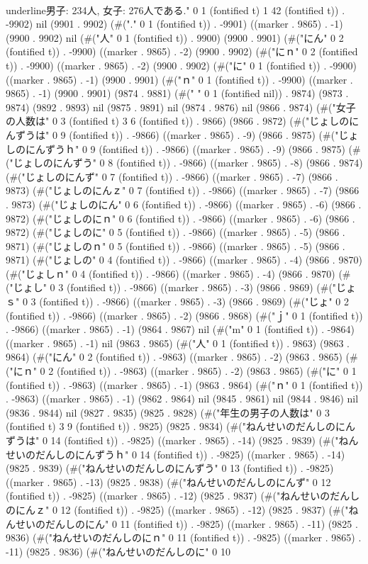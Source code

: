	      \\underline{男子: 234人, 女子: 276人}である." 0 1 (fontified t) 1 42 (fontified t)) . -9902) nil (9901 . 9902) (#("." 0 1 (fontified t)) . -9901) ((marker . 9865) . -1) (9900 . 9902) nil (#("人" 0 1 (fontified t)) . 9900) (9900 . 9901) (#("にん" 0 2 (fontified t)) . -9900) ((marker . 9865) . -2) (9900 . 9902) (#("にｎ" 0 2 (fontified t)) . -9900) ((marker . 9865) . -2) (9900 . 9902) (#("に" 0 1 (fontified t)) . -9900) ((marker . 9865) . -1) (9900 . 9901) (#("ｎ" 0 1 (fontified t)) . -9900) ((marker . 9865) . -1) (9900 . 9901) (9874 . 9881) (#(" " 0 1 (fontified nil)) . 9874) (9873 . 9874) (9892 . 9893) nil (9875 . 9891) nil (9874 . 9876) nil (9866 . 9874) (#("女子の人数は" 0 3 (fontified t) 3 6 (fontified t)) . 9866) (9866 . 9872) (#("じょしのにんずうは" 0 9 (fontified t)) . -9866) ((marker . 9865) . -9) (9866 . 9875) (#("じょしのにんずうｈ" 0 9 (fontified t)) . -9866) ((marker . 9865) . -9) (9866 . 9875) (#("じょしのにんずう" 0 8 (fontified t)) . -9866) ((marker . 9865) . -8) (9866 . 9874) (#("じょしのにんず" 0 7 (fontified t)) . -9866) ((marker . 9865) . -7) (9866 . 9873) (#("じょしのにんｚ" 0 7 (fontified t)) . -9866) ((marker . 9865) . -7) (9866 . 9873) (#("じょしのにん" 0 6 (fontified t)) . -9866) ((marker . 9865) . -6) (9866 . 9872) (#("じょしのにｎ" 0 6 (fontified t)) . -9866) ((marker . 9865) . -6) (9866 . 9872) (#("じょしのに" 0 5 (fontified t)) . -9866) ((marker . 9865) . -5) (9866 . 9871) (#("じょしのｎ" 0 5 (fontified t)) . -9866) ((marker . 9865) . -5) (9866 . 9871) (#("じょしの" 0 4 (fontified t)) . -9866) ((marker . 9865) . -4) (9866 . 9870) (#("じょしｎ" 0 4 (fontified t)) . -9866) ((marker . 9865) . -4) (9866 . 9870) (#("じょし" 0 3 (fontified t)) . -9866) ((marker . 9865) . -3) (9866 . 9869) (#("じょｓ" 0 3 (fontified t)) . -9866) ((marker . 9865) . -3) (9866 . 9869) (#("じょ" 0 2 (fontified t)) . -9866) ((marker . 9865) . -2) (9866 . 9868) (#("ｊ" 0 1 (fontified t)) . -9866) ((marker . 9865) . -1) (9864 . 9867) nil (#("m" 0 1 (fontified t)) . -9864) ((marker . 9865) . -1) nil (9863 . 9865) (#("人" 0 1 (fontified t)) . 9863) (9863 . 9864) (#("にん" 0 2 (fontified t)) . -9863) ((marker . 9865) . -2) (9863 . 9865) (#("にｎ" 0 2 (fontified t)) . -9863) ((marker . 9865) . -2) (9863 . 9865) (#("に" 0 1 (fontified t)) . -9863) ((marker . 9865) . -1) (9863 . 9864) (#("ｎ" 0 1 (fontified t)) . -9863) ((marker . 9865) . -1) (9862 . 9864) nil (9845 . 9861) nil (9844 . 9846) nil (9836 . 9844) nil (9827 . 9835) (9825 . 9828) (#("年生の男子の人数は" 0 3 (fontified t) 3 9 (fontified t)) . 9825) (9825 . 9834) (#("ねんせいのだんしのにんずうは" 0 14 (fontified t)) . -9825) ((marker . 9865) . -14) (9825 . 9839) (#("ねんせいのだんしのにんずうｈ" 0 14 (fontified t)) . -9825) ((marker . 9865) . -14) (9825 . 9839) (#("ねんせいのだんしのにんずう" 0 13 (fontified t)) . -9825) ((marker . 9865) . -13) (9825 . 9838) (#("ねんせいのだんしのにんず" 0 12 (fontified t)) . -9825) ((marker . 9865) . -12) (9825 . 9837) (#("ねんせいのだんしのにんｚ" 0 12 (fontified t)) . -9825) ((marker . 9865) . -12) (9825 . 9837) (#("ねんせいのだんしのにん" 0 11 (fontified t)) . -9825) ((marker . 9865) . -11) (9825 . 9836) (#("ねんせいのだんしのにｎ" 0 11 (fontified t)) . -9825) ((marker . 9865) . -11) (9825 . 9836) (#("ねんせいのだんしのに" 0 10 